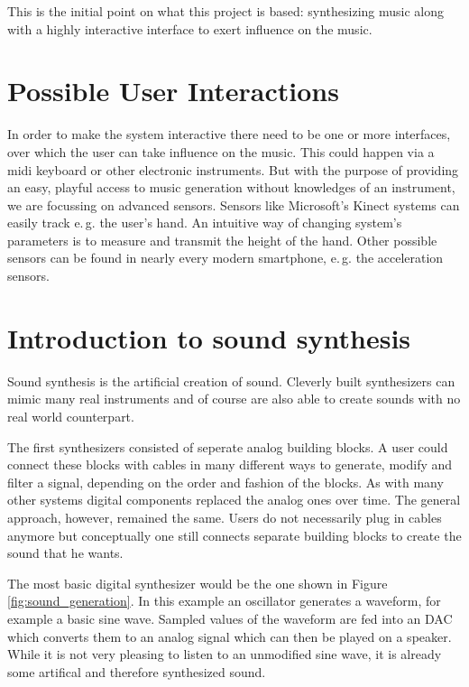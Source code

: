 	This is the initial point on what this project is based: synthesizing music along with a highly interactive interface to exert influence on the music.

	\section{Possible User Interactions}
	In order to make the system interactive there need to be one or more interfaces, over which the user can take influence on the music. This could happen via a midi keyboard or other electronic instruments. But with the purpose of providing an easy, playful access to music generation without knowledges of an instrument, we are focussing on advanced sensors. Sensors like Microsoft's Kinect systems can easily track e.\,g. the user's hand. An intuitive way of changing system's parameters is to measure and transmit the height of the hand. Other possible sensors can be found in nearly every modern smartphone, e.\,g. the acceleration sensors.
	
			
				
	\section{Introduction to sound synthesis}
		Sound synthesis is the artificial creation of sound. 
		Cleverly built synthesizers can mimic many real instruments 
		and of course are also able to create sounds with no real world counterpart.
		
		The first synthesizers consisted of seperate analog building blocks.
		A user could connect these blocks with cables in many different ways to generate, modify and filter a signal, depending on the order and fashion of the blocks.
		As with many other systems digital components replaced the analog ones over time.
		The general approach, however, remained the same. 
		Users do not necessarily plug in cables anymore but conceptually one still connects separate building blocks to create the sound that he wants.
		
		The most basic digital synthesizer would be the one shown in Figure \ref{fig:sound_generation}. 
		In this example an oscillator generates a waveform, for example a basic sine wave.
		Sampled values of the waveform are fed into an \ac{DAC} which converts them to an analog signal which can then be played on a speaker.
		While it is not very pleasing to listen to an unmodified sine wave, it is already some artifical and therefore synthesized sound.
		
